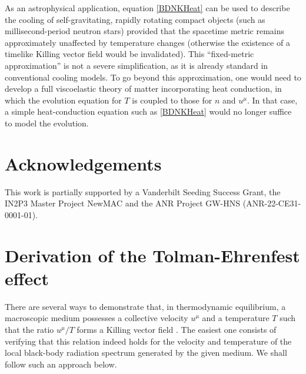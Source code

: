 \documentclass[a4paper, amsfonts, amssymb, amsmath, reprint, showkeys, nofootinbib, twoside, onecolumn,notitlepage]{revtex4-1}
\theoremstyle{definition}
\theoremstyle{theorem}
\begin{document}
{\color{black} As an astrophysical application, equation \eqref{BDNKHeat} can be used to describe the cooling of self-gravitating, rapidly rotating compact objects (such as millisecond-period neutron stars) provided that the spacetime metric remains approximately unaffected by temperature changes (otherwise the existence of a timelike Killing vector field would be invalidated). This ``fixed-metric approximation'' is not a severe simplification, as it is already standard in conventional cooling models. To go beyond this approximation, one would need to develop a full viscoelastic theory of matter incorporating heat conduction, in which the evolution equation for $T$ is coupled to those for $n$ and $u^\mu$. In that case, a simple heat-conduction equation such as \eqref{BDNKHeat} would no longer suffice to model the evolution.}



\section*{Acknowledgements}

This work is partially supported by a Vanderbilt Seeding Success Grant, the IN2P3 Master Project NewMAC and the ANR Project GW-HNS (ANR-22-CE31-0001-01).
 
\appendix

\section{Derivation of the Tolman-Ehrenfest effect}\label{AppAAA}

There are several ways to demonstrate that, in thermodynamic equilibrium, a macroscopic medium possesses a collective velocity $u^\mu$ and a temperature $T$ such that the ratio $u^\mu/T$ forms a Killing vector field \cite{TolmanLaw1930,BecattiniBeta2016,Santiago:2019aem}. The easiest one consists of verifying that this relation indeed holds for the velocity and temperature of the local black-body radiation spectrum generated by the given medium. We shall follow such an approach below.
\end{document}
